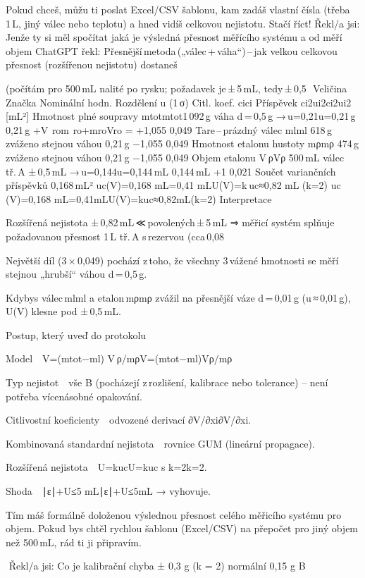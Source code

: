 {Pokud chceš, můžu ti poslat Excel/CSV šablonu, kam zadáš vlastní čísla (třeba 1 L, jiný válec nebo teplotu) a hned vidíš celkovou nejistotu. Stačí říct!
Řekl/a jsi:
Jenže ty si měl spočítat jaká je výsledná přesnost měřícího systému a od měří objem
ChatGPT řekl:
Přesnější metoda („válec + váha“) – jak velkou celkovou přesnost (rozšířenou nejistotu) dostaneš

(počítám pro 500 mL nalité po rysku; požadavek je ± 5 mL, tedy ± 0,5  %
Veličina	Značka	Nominální hodn.	Rozdělení	u (1 σ)	Citl. koef. cici​	Příspěvek ci2ui2ci2​ui2​ [mL²]
Hmotnost plné soupravy	mtotmtot​	1 092 g	váha d = 0,5 g → u=0,21u=0,21 g	0,21 g	+V  ⁣rom  ⁣ro+mro​Vro​​ = +1,055	0,049
Tare – prázdný válec	mlml​	618 g	zváženo stejnou váhou	0,21 g	−1,055	0,049
Hmotnost etalonu hustoty	mρmρ​	474 g	zváženo stejnou váhou	0,21 g	−1,055	0,049
Objem etalonu	V ⁣ρVρ​	500 mL	válec tř. A ± 0,5 mL → u=0,144u=0,144 mL	0,144 mL	+1	0,021
Součet variančních příspěvků						0,168 mL²
uc(V)=0,168  mL=0,41  mLU(V)=k uc≈0,82  mL  (k=2)
uc​(V)=0,168
​mL=0,41mLU(V)=kuc​≈0,82mL(k=2)​
Interpretace

    Rozšířená nejistota ± 0,82 mL ≪ povolených ± 5 mL ⇒ měřicí systém splňuje požadovanou přesnost 1 L tř. A s rezervou (cca 0,08 %

    Největší díl (3 × 0,049) pochází z toho, že všechny 3 vážené hmotnosti se měří stejnou „hrubší“ váhou d = 0,5 g.

    Kdybys válec mlml​ a etalon mρmρ​ zvážil na přesnější váze d = 0,01 g (u ≈ 0,01 g), U(V) klesne pod ± 0,5 mL.

Postup, který uveď do protokolu

    Model V=(mtot−ml)  V ⁣ρ/mρV=(mtot​−ml​)Vρ​/mρ​

    Typ nejistot vše B (pocházejí z rozlišení, kalibrace nebo tolerance) – není potřeba vícenásobné opakování.

    Citlivostní koeficienty odvozené derivací ∂V/∂xi∂V/∂xi​.

    Kombinovaná standardní nejistota rovnice GUM (lineární propagace).

    Rozšířená nejistota U=kucU=kuc​ s k=2k=2.

    Shoda ∣ε∣+U≤5  mL∣ε∣+U≤5mL → vyhovuje.

Tím máš formálně doloženou výslednou přesnost celého měřicího systému pro objem. Pokud bys chtěl rychlou šablonu (Excel/CSV) na přepočet pro jiný objem než 500 mL, rád ti ji připravím. ​

​
Řekl/a jsi:
Co je kalibrační chyba	± 0,3 g (k = 2)	normální	0,15 g	B

}
